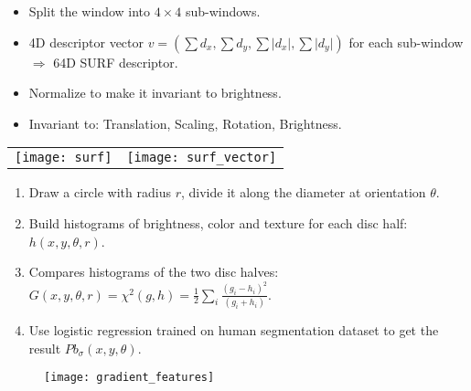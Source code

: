 \documentclass[11pt, a4paper, landscape]{article}
\begin{document}
\NewPage{}
\vfill
\begin{itemize}
\item Split the window into $4 \times 4$ sub-windows.
\item 4D descriptor vector $v = (\sum d_x, \sum d_y, \sum \lvert d_x \rvert, \sum \lvert d_y \rvert)$ for each sub-window\\
$\Rightarrow$ 64D SURF descriptor.
\item Normalize to make it invariant to brightness.
\item Invariant to: Translation, Scaling, Rotation, Brightness.
\end{itemize}
\begin{table}
  \centering
  \begin{tabular}{@{} M{.5\linewidth} M{.5\linewidth} @{}}
      \texttt{[image: surf]}
      &
      \texttt{[image: surf\_vector]}%
  \end{tabular}
\end{table}
\vfill





\NewPage{}
\small
\vfill
\begin{enumerate}
\item Draw a circle with radius $r$, divide it along the diameter at orientation $\theta$.
\item Build histograms of brightness, color and texture for each disc half: $h(x, y, \theta, r)$.
\item Compares histograms of the two disc halves: $G(x, y, \theta, r) = \chi ^ 2 (g, h) = \frac{1}{2} \sum_i \frac{(g_i - h_i)^2}{(g_i + h_i)}$.
\item Use logistic regression trained on human segmentation dataset to get the result $Pb_{\sigma}(x, y, \theta)$.
\end{enumerate}
\begin{figure}
	\centering
	\texttt{[image: gradient\_features]}
\end{figure}
\vfill
\end{document}
